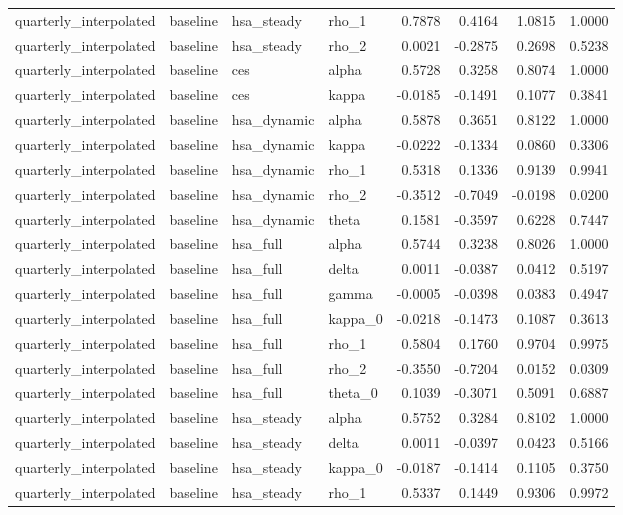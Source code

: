 \begin{tabular}{llllrrrr}
quarterly\_interpolated & baseline & hsa\_steady & rho\_1 & 0.7878 & 0.4164 & 1.0815 & 1.0000 \\
quarterly\_interpolated & baseline & hsa\_steady & rho\_2 & 0.0021 & -0.2875 & 0.2698 & 0.5238 \\
quarterly\_interpolated & baseline & ces & alpha & 0.5728 & 0.3258 & 0.8074 & 1.0000 \\
quarterly\_interpolated & baseline & ces & kappa & -0.0185 & -0.1491 & 0.1077 & 0.3841 \\
quarterly\_interpolated & baseline & hsa\_dynamic & alpha & 0.5878 & 0.3651 & 0.8122 & 1.0000 \\
quarterly\_interpolated & baseline & hsa\_dynamic & kappa & -0.0222 & -0.1334 & 0.0860 & 0.3306 \\
quarterly\_interpolated & baseline & hsa\_dynamic & rho\_1 & 0.5318 & 0.1336 & 0.9139 & 0.9941 \\
quarterly\_interpolated & baseline & hsa\_dynamic & rho\_2 & -0.3512 & -0.7049 & -0.0198 & 0.0200 \\
quarterly\_interpolated & baseline & hsa\_dynamic & theta & 0.1581 & -0.3597 & 0.6228 & 0.7447 \\
quarterly\_interpolated & baseline & hsa\_full & alpha & 0.5744 & 0.3238 & 0.8026 & 1.0000 \\
quarterly\_interpolated & baseline & hsa\_full & delta & 0.0011 & -0.0387 & 0.0412 & 0.5197 \\
quarterly\_interpolated & baseline & hsa\_full & gamma & -0.0005 & -0.0398 & 0.0383 & 0.4947 \\
quarterly\_interpolated & baseline & hsa\_full & kappa\_0 & -0.0218 & -0.1473 & 0.1087 & 0.3613 \\
quarterly\_interpolated & baseline & hsa\_full & rho\_1 & 0.5804 & 0.1760 & 0.9704 & 0.9975 \\
quarterly\_interpolated & baseline & hsa\_full & rho\_2 & -0.3550 & -0.7204 & 0.0152 & 0.0309 \\
quarterly\_interpolated & baseline & hsa\_full & theta\_0 & 0.1039 & -0.3071 & 0.5091 & 0.6887 \\
quarterly\_interpolated & baseline & hsa\_steady & alpha & 0.5752 & 0.3284 & 0.8102 & 1.0000 \\
quarterly\_interpolated & baseline & hsa\_steady & delta & 0.0011 & -0.0397 & 0.0423 & 0.5166 \\
quarterly\_interpolated & baseline & hsa\_steady & kappa\_0 & -0.0187 & -0.1414 & 0.1105 & 0.3750 \\
quarterly\_interpolated & baseline & hsa\_steady & rho\_1 & 0.5337 & 0.1449 & 0.9306 & 0.9972 \\

\end{tabular}
